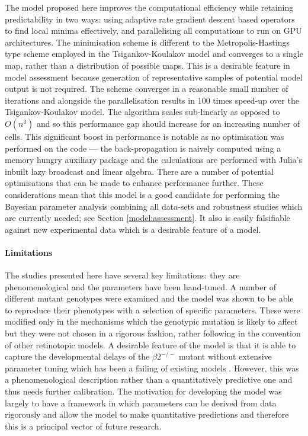 The model proposed here improves the computational efficiency while retaining predictability in two ways: using adaptive rate gradient descent based operators to find local minima effectively, and parallelising all computations to run on GPU architectures. The minimisation scheme is different to the Metropolis-Hastings type scheme employed in the Tsigankov-Koulakov model and converges to a single map, rather than a distribution of possible maps. This is a desirable feature in model assessment because generation of representative samples of potential model output is not required. The scheme converges in a reasonable small number of iterations and alongside the parallelisation results in 100 times speed-up over the Tsigankov-Koulakov model. The algorithm scales sub-linearly as opposed to $O(n^3)$ and so this performance gap should increase for an increasing number of cells. This significant boost in performance is notable as no optimisation was performed on the code --- the back-propagation is naively computed using a memory hungry auxiliary package and the calculations are performed with Julia's inbuilt lazy broadcast and linear algebra. There are a number of potential optimisations that can be made to enhance performance further. These considerations mean that this model is a good candidate for performing the Bayesian parameter analysis combining all data-sets and robustness studies which are currently needed; see Section \ref{model:assessment}. It also is easily falsifiable against new experimental data which is a desirable feature of a model.
\paragraph{Limitations}
The studies presented here have several key limitations: they are phenomenological and the parameters have been hand-tuned. A number of different mutant genotypes were examined and the model was shown to be able to reproduce their phenotypes with a selection of specific parameters. These were modified only in the mechanisms which the genotypic mutation is likely to affect but they were not chosen in a rigorous fashion, rather following in the convention of other retinotopic models. A desirable feature of the model is that it is able to capture the developmental delays of the $\beta2^{-/-}$ mutant without extensive parameter tuning which has been a failing of existing models \cite{Lyngholm2019-fs}. However, this was a phenomenological description rather than a quantitatively predictive one and thus needs further calibration. The motivation for developing the model was largely to have a framework in which parameters can be derived from data rigorously and allow the model to make quantitative predictions and therefore this is a principal vector of future research.
